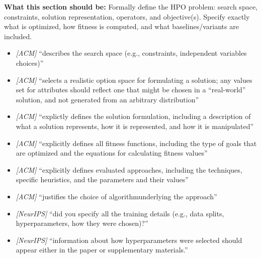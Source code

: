 \noindent\textbf{What this section should be:}
Formally define the HPO problem: search space, constraints, solution representation, operators, and objective(s). Specify exactly what is optimized, how fitness is computed, and what baselines/variants are included.
\begin{itemize}
  \item \textit{[ACM]} ``describes the search space (e.g., constraints, independent variables choices)''
  \item \textit{[ACM]} ``selects a realistic option space for formulating a solution; any values set for attributes should reflect one that might be chosen in a ``real-world'' solution, and not generated from an arbitrary distribution''
  \item \textit{[ACM]} ``explictly defines the solution formulation, including a description of what a solution represents, how it is represented, and how it is manipulated''
  \item \textit{[ACM]} ``explicitly defines all fitness functions, including the type of goals that are optimized and the equations for calculating fitness values''
  \item \textit{[ACM]} ``explicitly defines evaluated approaches, including the techniques, specific heuristics, and the parameters and their values''
  \item \textit{[ACM]} ``justifies the choice of algorithmunderlying the approach''
  \item \textit{[NeurIPS]} ``did you specify all the training details (e.g., data splits, hyperparameters, how they were chosen)?''
  \item \textit{[NeurIPS]} ``information about how hyperparameters were selected should appear either in the paper or supplementary materials.''
\end{itemize}